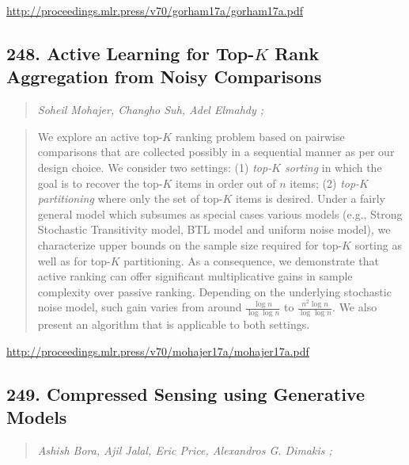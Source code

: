 \documentclass{article}
\begin{document}
\href{http://proceedings.mlr.press/v70/gorham17a/gorham17a.pdf}{http://proceedings.mlr.press/v70/gorham17a/gorham17a.pdf}

\subsection{248. Active Learning for Top-$K$ Rank Aggregation from Noisy Comparisons}

\begin{quote}
\footnotesize{\textit{Soheil Mohajer, Changho Suh, Adel Elmahdy ;}}
\end{quote}

\begin{quote}
    We explore an active top-$K$ ranking problem based on pairwise comparisons that are collected possibly in a sequential manner as per our design choice. We consider two settings: (1) \textit{top-$K$ sorting} in which the goal is to recover the top-$K$ items in order out of $n$ items; (2) \textit{top-$K$ partitioning} where only the set of top-$K$ items is desired. Under a fairly general model which subsumes as special cases various models (e.g., Strong Stochastic Transitivity model, BTL model and uniform noise model), we characterize upper bounds on the sample size required for top-$K$ sorting as well as for top-$K$ partitioning. As a consequence, we demonstrate that active ranking can offer significant multiplicative gains in sample complexity over passive ranking. Depending on the underlying stochastic noise model, such gain varies from around $\frac{\log n}{\log \log n}$ to $\frac{ n^2 \log n }{\log \log n}$. We also present an algorithm that is applicable to both settings.  \end{quote}

\href{http://proceedings.mlr.press/v70/mohajer17a/mohajer17a.pdf}{http://proceedings.mlr.press/v70/mohajer17a/mohajer17a.pdf}

\subsection{249. Compressed Sensing using Generative Models}

\begin{quote}
\footnotesize{\textit{Ashish Bora, Ajil Jalal, Eric Price, Alexandros G. Dimakis ;}}
\end{quote}
\end{document}
